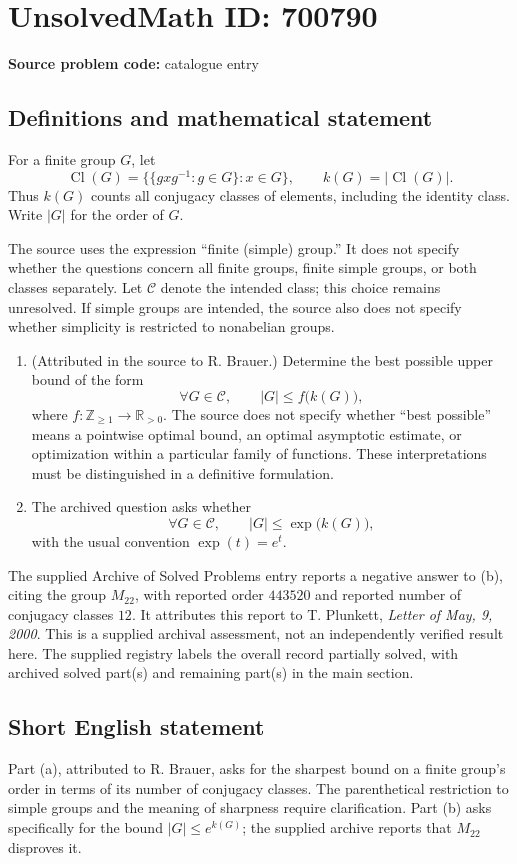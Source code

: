 \documentclass[11pt]{article}
\newcommand{\Z}{\mathbb{Z}}
\newcommand{\R}{\mathbb{R}}
\begin{document}
\section*{UnsolvedMath ID: 700790}
\textbf{Source problem code:} catalogue entry
\subsection{Definitions and mathematical statement}
For a finite group \(G\), let
\[
\operatorname{Cl}(G)=\bigl\{\{gxg^{-1}:g\in G\}:x\in G\bigr\},\qquad k(G)=|\operatorname{Cl}(G)|.
\]
Thus \(k(G)\) counts all conjugacy classes of elements, including the identity class. Write \(|G|\) for the order of \(G\).

The source uses the expression ``finite (simple) group.'' It does not specify whether the questions concern all finite groups, finite simple groups, or both classes separately. Let \(\mathcal C\) denote the intended class; this choice remains unresolved. If simple groups are intended, the source also does not specify whether simplicity is restricted to nonabelian groups.

\begin{enumerate}
\item[(a)] (Attributed in the source to R. Brauer.) Determine the best possible upper bound of the form
\[
\forall G\in\mathcal C,\qquad |G|\leq f\bigl(k(G)\bigr),
\]
where \(f:\Z_{\geq 1}\to\R_{>0}\). The source does not specify whether ``best possible'' means a pointwise optimal bound, an optimal asymptotic estimate, or optimization within a particular family of functions. These interpretations must be distinguished in a definitive formulation.
\item[(b)] The archived question asks whether
\[
\forall G\in\mathcal C,\qquad |G|\leq \exp\bigl(k(G)\bigr),
\]
with the usual convention \(\exp(t)=e^t\).
\end{enumerate}

The supplied Archive of Solved Problems entry reports a negative answer to (b), citing the group \(M_{22}\), with reported order \(443520\) and reported number of conjugacy classes \(12\). It attributes this report to T. Plunkett, \emph{Letter of May, 9, 2000}. This is a supplied archival assessment, not an independently verified result here. The supplied registry labels the overall record partially solved, with archived solved part(s) and remaining part(s) in the main section.
\subsection{Short English statement}
Part (a), attributed to R. Brauer, asks for the sharpest bound on a finite group's order in terms of its number of conjugacy classes. The parenthetical restriction to simple groups and the meaning of sharpness require clarification. Part (b) asks specifically for the bound \(|G|\leq e^{k(G)}\); the supplied archive reports that \(M_{22}\) disproves it.
\end{document}
